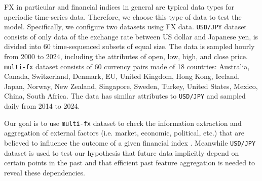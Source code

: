 \documentclass[aps,prb,groupedaddress,twocolumn,showpacs,dvipdfmx,superscriptaddress,pdftex]{revtex4-2}
\begin{document}

FX in particular and financial indices in general are typical data types for aperiodic time-series data. Therefore, we choose this type of data to test the model. Specifically, we configure two datasets using FX data. \verb|USD/JPY| dataset consists of only data of the exchange rate between US dollar and Japanese yen, is divided into 60 time-sequenced subsets of equal size. The data is sampled hourly from 2000 to 2024, including the attributes of open, low, high, and close price. \verb|multi-fx| dataset consists of 60 currency pairs made of 18 countries: Australia, Canada, Switzerland, Denmark, EU, United Kingdom, Hong Kong, Iceland, Japan, Norway, New Zealand, Singapore, Sweden, Turkey, United States, Mexico, China, South Africa. The data has similar attributes to \verb|USD/JPY| and sampled daily from 2014 to 2024.

\vspace{2mm}


Our goal is to use \verb|multi-fx| dataset to check the information extraction and aggregation of external factors (i.e. market, economic, political, etc.) that are believed to influence the outcome of a given financial index \citep{overreactioncontrarian,fama1970efficient,mech1993portfolio}. Meanwhile \verb|USD/JPY| dataset is used to test our hypothesis that future data implicitly depend on certain points in the past and that efficient past feature aggregation is needed to reveal these dependencies.
\end{document}
